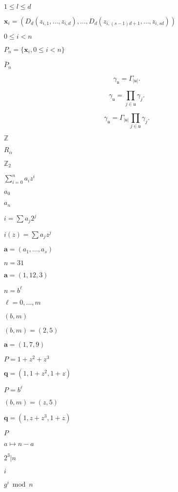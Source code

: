 \documentclass{article}
\begin{document}
$1 \leq l \leq d$
\pagebreak

$\boldsymbol x_i = (D_d(z_{i,1}, \dots, z_{i,d}), \dots, D_d(z_{i,(s-1)d + 1}, \dots, z_{i,sd}) )$
\pagebreak

$0 \leq i < n$
\pagebreak

$P_n = \{\boldsymbol x_i, 0 \leq i < n \}$
\pagebreak

$\bar{P}_n$
\pagebreak

\[    \gamma_{\mathfrak u} = \Gamma_{|\mathfrak u|}.
\]
\pagebreak

\[    \gamma_{\mathfrak u} = \prod_{j \in \mathfrak u} \gamma_j.
\]
\pagebreak

\[    \gamma_{\mathfrak u} =
    \Gamma_{|\mathfrak u|}
    \prod_{j \in \mathfrak u} \gamma_j.
\]
\pagebreak

$\mathbb Z$
\pagebreak

$R_\alpha$
\pagebreak

$\mathbb{Z}_2$
\pagebreak

$ \sum_{i=0}^{n} a_iz^i $
\pagebreak

$a_0$
\pagebreak

$a_n$
\pagebreak

$ i = \sum a_j2^j $
\pagebreak

$ i(z) = \sum a_jz^j $
\pagebreak

$\boldsymbol
a = (a_1, \dots, a_s)$
\pagebreak

$n=31$
\pagebreak

$\boldsymbol a = (1,12,3)$
\pagebreak

$n=b^\ell$
\pagebreak

$\ell=0,\dots,m$
\pagebreak

$(b,m)$
\pagebreak

$(b,m)=(2,5)$
\pagebreak

$\boldsymbol a =
    (1,7,9)$
\pagebreak

$P = 1 + z^2 + z^3$
\pagebreak

$\boldsymbol q = (1,1+z^2,1+z)$
\pagebreak

$P=b^\ell$
\pagebreak

$(b,m)=(z,5)$
\pagebreak

$\boldsymbol q =
    (1,z+z^3,1+z)$
\pagebreak

$P$
\pagebreak

$a \mapsto n -
a$
\pagebreak

$2^3|n$
\pagebreak

$i$
\pagebreak

$g^i \bmod n$
\pagebreak
\end{document}
